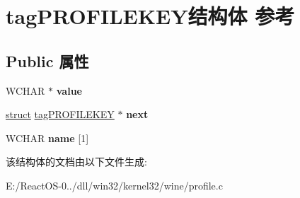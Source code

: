\hypertarget{structtag_p_r_o_f_i_l_e_k_e_y}{}\section{tag\+P\+R\+O\+F\+I\+L\+E\+K\+E\+Y结构体 参考}
\label{structtag_p_r_o_f_i_l_e_k_e_y}
\subsection*{Public 属性}
\begin{DoxyCompactItemize}
\item 
\mbox{\label{structtag_p_r_o_f_i_l_e_k_e_y_aa91e4223f9e9bf6d2598d6e18b32e9c3}} 
W\+C\+H\+AR $\ast$ {\bfseries value}
\item 
\mbox{\label{structtag_p_r_o_f_i_l_e_k_e_y_ab137781f0e0808142f0b1e3c258ff635}} 
\hyperlink{interfacestruct}{struct} \hyperlink{structtag_p_r_o_f_i_l_e_k_e_y}{tag\+P\+R\+O\+F\+I\+L\+E\+K\+EY} $\ast$ {\bfseries next}
\item 
\mbox{\label{structtag_p_r_o_f_i_l_e_k_e_y_ac112e8f9487a4447731d6c367b701a5d}} 
W\+C\+H\+AR {\bfseries name} \mbox{[}1\mbox{]}
\end{DoxyCompactItemize}


该结构体的文档由以下文件生成\+:\begin{DoxyCompactItemize}
\item 
E\+:/\+React\+O\+S-\/0../dll/win32/kernel32/wine/profile.\+c\end{DoxyCompactItemize}
